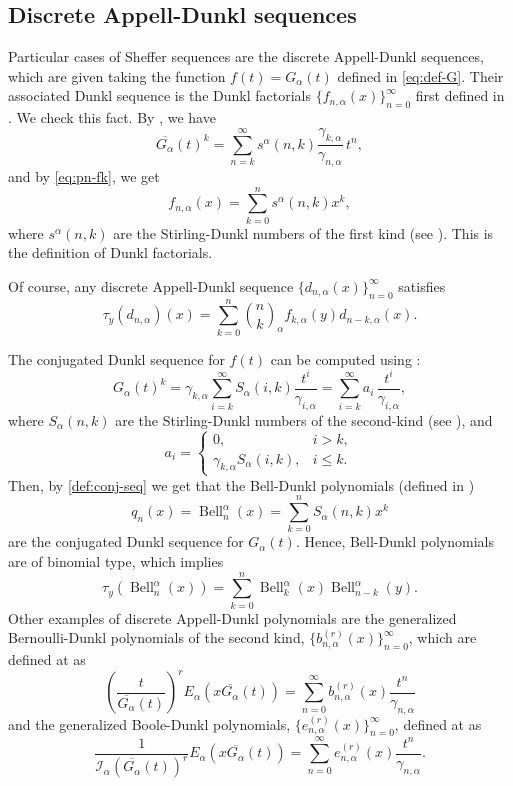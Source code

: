 \documentclass[11pt]{article}
\theoremstyle{plain}
\theoremstyle{remark}
\newtheorem{example}[theorem]{Example}
\numberwithin{equation}{section} %
\newcommand{\Ea}{E_{\alpha}}
\newcommand{\binoma}[2]{\binom{#1}{#2}_{\!\alpha}}
\newcommand{\I}{\mathcal{I}}
\newcommand{\Bell}{\operatorname{Bell}}
\begin{document}
\subsection{Discrete Appell-Dunkl sequences}

Particular cases of Sheffer sequences are the discrete Appell-Dunkl sequences, which are given taking the function $f(t) = G_\alpha(t)$ defined in \eqref{eq:def-G}. Their associated Dunkl sequence is the Dunkl factorials $\{f_{n,\alpha}(x)\}_{n=0}^{\infty}$ first defined in \cite{ELMV}. We check this fact. By \cite[(27)]{MV2}, we have
\[
\overline{G_\alpha}(t)^k = \sum_{n=k}^\infty s^\alpha(n,k) \frac{\gamma_{k,\alpha}}{\gamma_{n,\alpha}} \,t^n,
\]
and by \eqref{eq:pn-fk}, we get
\[
f_{n,\alpha}(x) = \sum_{k=0}^n s^\alpha(n,k) x^k,
\]
where $s^\alpha(n,k)$ are the Stirling-Dunkl numbers of the first kind (see  \cite[\S 3]{MV2}). This is the definition of Dunkl factorials.

Of course, any discrete Appell-Dunkl sequence $\{d_{n,\alpha}(x)\}_{n=0}^{\infty}$ satisfies
\[
\tau_y(d_{n,\alpha})(x) = \sum_{k=0}^{n} \binoma{n}{k}f_{k,\alpha}(y)d_{n-k,\alpha}(x).
\]

The conjugated Dunkl sequence for $f(t)$ can be computed using \cite[(33)]{MV2}:
\[
G_\alpha(t)^k = \gamma_{k,\alpha} \sum_{i=k}^{\infty} {S_\alpha(i,k)} \frac{t^i}{\gamma_{i,\alpha}}
= \sum_{i=k}^{\infty} {a_i}\, \frac{t^i}{\gamma_{i,\alpha}},
\]
where $S_\alpha(n,k)$ are the Stirling-Dunkl numbers of the second-kind (see \cite[\S\,4]{MV2}), and
\[
a_i =
\begin{cases}
0, & i>k, \\
\gamma_{k,\alpha}S_\alpha(i,k), & i\leq k.
\end{cases}
\]
Then, by \eqref{def:conj-seq} we get that the Bell-Dunkl polynomials (defined in \cite[(45)]{MV2})
\[
q_n(x) = \Bell_n^\alpha(x) = \sum_{k=0}^{n}S_\alpha(n,k)x^k
\]
are the conjugated Dunkl sequence for $G_\alpha(t)$. Hence, Bell-Dunkl polynomials are of binomial type, which implies
\[
\tau_y( \Bell_n^\alpha(x)) = \sum_{k=0}^n \Bell_k^\alpha(x) \Bell_{n-k}^\alpha(y).
\]
Other examples of discrete Appell-Dunkl polynomials are the generalized Bernoulli-Dunkl polynomials of the second kind, $\{b_{n,\alpha}^{(r)}(x)\}_{n=0}^{\infty}$, which are defined at \cite{ELMV} as
\begin{equation*}
  \left(\frac{t}{\overline{G_{\alpha}}(t)}\right)^r \Ea(x \overline{G_{\alpha}}(t)) 
  = \sum_{n=0}^{\infty} b_{n,\alpha}^{(r)}(x) \frac{t^n}{\gamma_{n,\alpha}}
\end{equation*}
and the generalized Boole-Dunkl polynomials, $\{e_{n,\alpha}^{(r)}(x)\}_{n=0}^{\infty}$, defined at \cite{GLMV} as
\begin{equation*}
  \frac{1}{\I_\alpha(\overline{G_{\alpha}}(t))^r} \Ea(x \overline{G_{\alpha}}(t)) 
  = \sum_{n=0}^{\infty} e_{n,\alpha}^{(r)}(x) \frac{t^n}{\gamma_{n,\alpha}}.
\end{equation*}
\end{document}
